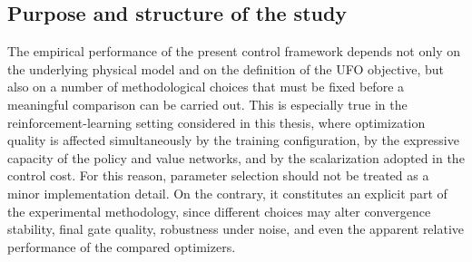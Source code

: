 \subsection{Purpose and structure of the study}
\label{subsec:parameter_choice_aim_and_structure}
The empirical performance of the present control framework depends not only on the underlying physical model and on the definition of the UFO objective, but also on a number of methodological choices that must be fixed before a meaningful comparison can be carried out. This is especially true in the reinforcement-learning setting considered in this thesis, where optimization quality is affected simultaneously by the training configuration, by the expressive capacity of the policy and value networks, and by the scalarization adopted in the control cost. For this reason, parameter selection should not be treated as a minor implementation detail. On the contrary, it constitutes an explicit part of the experimental methodology, since different choices may alter convergence stability, final gate quality, robustness under noise, and even the apparent relative performance of the compared optimizers.

